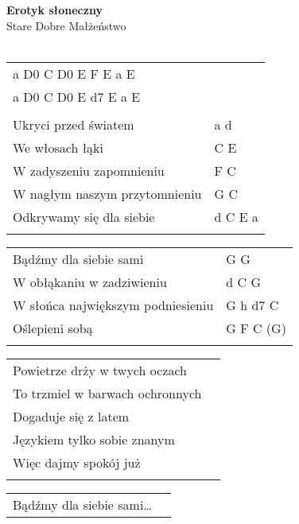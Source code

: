 \documentclass[a5paper]{article}
\begin{document}


\noindent
\fontsize{12pt}{15pt}\selectfont
\textbf{Erotyk słoneczny} \\
\fontsize{8pt}{10pt}\selectfont
Stare Dobre Małżeństwo \\ \\
\fontsize{10pt}{12pt}\selectfont
{}
\begin{tabular}{@{}p{8.50cm}p{3cm}@{}}
\noindent
a D0 C D0 E F E a E \\
a D0 C D0 E d7 E a E \\ \\

Ukryci przed światem & a d \\
We włosach łąki & C E \\
W zadyszeniu zapomnieniu & F C \\
W nagłym naszym przytomnieniu & G C \\
Odkrywamy się dla siebie & d C E a \\ \\
\end{tabular}

\noindent
\begin{tabular}{@{}p{7.50cm}p{3cm}@{}}
Bądźmy dla siebie sami & G G \\
W obłąkaniu w zadziwieniu & d C G \\
W słońca największym podniesieniu & G h d7 C \\
Oślepieni sobą & G F C (G) \\ \\
\end{tabular}

\noindent
\begin{tabular}{@{}p{7.50cm}p{3cm}@{}}
Powietrze drży w twych oczach \\
To trzmiel w barwach ochronnych \\
Dogaduje się z latem \\
Językiem tylko sobie znanym \\
Więc dajmy spokój już \\ \\
\end{tabular}

\noindent
\begin{tabular}{@{}p{7.50cm}p{3cm}@{}}
Bądźmy dla siebie sami…
\end{tabular}
\end{document}
